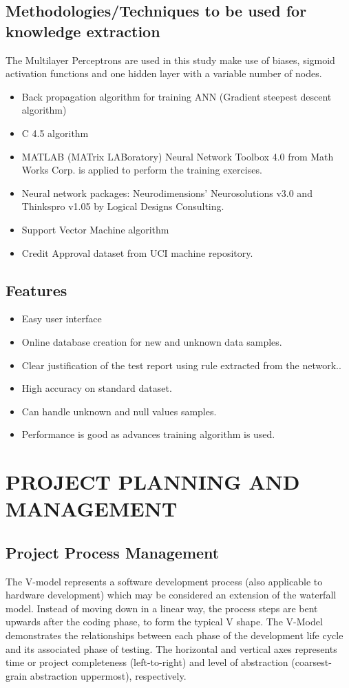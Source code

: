 \documentclass[a4paper,14pt,onecolumn]{article}
\begin{document}
\subsection{Methodologies/Techniques to be used for knowledge extraction}
The Multilayer Perceptrons are used in this study make use of biases, sigmoid         activation functions and one hidden layer with a variable number of nodes.
   \begin{itemize}
   \item Back propagation algorithm for training ANN (Gradient steepest descent algorithm)
   \item C 4.5 algorithm
   \item MATLAB (MATrix LABoratory) Neural Network Toolbox 4.0 from Math Works Corp. is applied to perform the training exercises. 
   \item Neural network packages: Neurodimensions’ Neurosolutions v3.0 and Thinkspro v1.05 by Logical Designs Consulting.
   \item Support  Vector Machine algorithm
   \item Credit Approval dataset from UCI machine repository.
   \end{itemize}

\subsection{Features}
   \begin{itemize}
  \item Easy user interface 
  \item Online database creation for new and unknown data samples.
  \item Clear justification of the test report using rule extracted from the network..
  \item High accuracy on standard dataset.
  \item Can handle unknown and null values samples.
  \item Performance is good as advances training algorithm is used.
   \end{itemize}

\newpage
\section{PROJECT PLANNING AND MANAGEMENT}
\subsection{Project Process Management}
The V-model represents a software development process (also applicable to hardware development) which may be considered an extension of the waterfall model. Instead of moving down in a linear way, the process steps are bent upwards after the coding phase, to form the typical V shape. The V-Model demonstrates the relationships between each phase of the development life cycle and its associated phase of testing. The horizontal and vertical axes represents time or project completeness (left-to-right) and level of abstraction (coarsest-grain abstraction uppermost), respectively.
\end{document}
